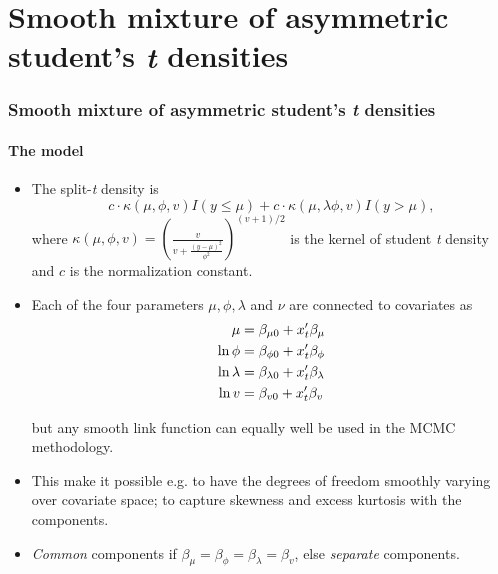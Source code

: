 \documentclass[10pt]{beamer}
\begin{document}
\section{Smooth mixture of asymmetric student's {\em t} densities}   
\begin{frame}
\frametitle{Smooth mixture of asymmetric student's {\em t} densities}
\framesubtitle{The model}
\begin{itemize}
\item The split-\emph{t} density is
\[
c \cdot \kappa \left( {\mu ,\phi ,v} \right)I\left( {y \leq \mu } \right) + c \cdot \kappa \left( {\mu ,\lambda \phi ,v} \right)I\left( {y > \mu } \right),
\]
where $ \kappa \left( {\mu ,\phi ,v} \right) = \left( {\frac{v}
{{v + \frac{{\left( {y - \mu } \right)^2 }}
{{\phi ^2 }}}}} \right)^{\left( {v + 1} \right)/2} $ is the kernel of student \emph{t} density and $c$ is the normalization constant.

\item  Each of the four parameters $\mu,\phi,\lambda$ and $\nu$ are connected
to covariates as
\[
\begin{split}
  \mu  &= \beta _{\mu 0}  + x_t '\beta _\mu   \hfill \\
  \ln \phi  &= \beta _{\phi 0}  + x_t '\beta _\phi   \hfill \\
  \ln \lambda & = \beta _{\lambda 0}  + x_t '\beta _\lambda   \hfill \\
  \ln v &= \beta _{v0}  + x_t '\beta _v  \hfill \\ 
\end{split} 
\]

but any smooth link function can equally well be used in the MCMC
methodology.
\item This make it possible e.g. to have the degrees of freedom smoothly varying over
  covariate space; to capture skewness and excess kurtosis with the components.
\item \emph{Common} components if $\beta _\mu=\beta _\phi=\beta _\lambda=\beta _v$, else  \emph{separate} components. 
\end{itemize}
\end{frame}
\end{document}
